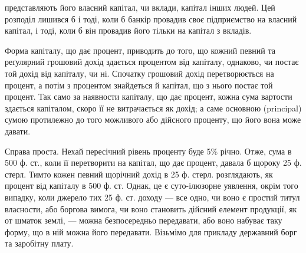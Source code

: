 представляють його власний капітал, чи вклади, капітал інших людей. Цей
розподіл лишився б і тоді, коли б банкір провадив своє підприємство на власний
капітал, і тоді, коли б він провадив його тільки на капітал з вкладів.

Форма капіталу, що дає процент, приводить до того, що кожний певний
та реґулярний грошовий дохід здається процентом від капіталу, однаково, чи
постає той дохід від капіталу, чи ні. Спочатку грошовий дохід перетворюється
на процент, а потім з процентом знайдеться й капітал, що з нього постає той
процент. Так само за наявности капіталу, що дає процент, кожна сума вартости
здається капіталом, скоро її не витрачається як дохід; а саме основною (principal)
сумою протилежно до того можливого або дійсного проценту, що його вона
може давати.

Справа проста. Нехай пересічний рівень проценту буде 5\% річно. Отже,
сума в 500 ф. ст., коли її перетворити на капітал, що дає процент, давала б
щороку 25 ф. стерл. Тимто кожен певний щорічний дохід в 25 ф. стерл. розглядають,
як процент від капіталу в 500 ф. ст. Однак, це є суто-ілюзорне
уявлення, окрім того випадку, коли джерело тих 25 ф. ст. доходу — все одно,
чи воно є простий титул власности, або боргова вимога, чи воно становить
дійсний елемент продукції, як от шматок землі, — можна безпосередньо передавати,
або воно набуває таку форму, що в ній можна його передавати. Візьмімо
для прикладу державний борг та заробітну плату.

